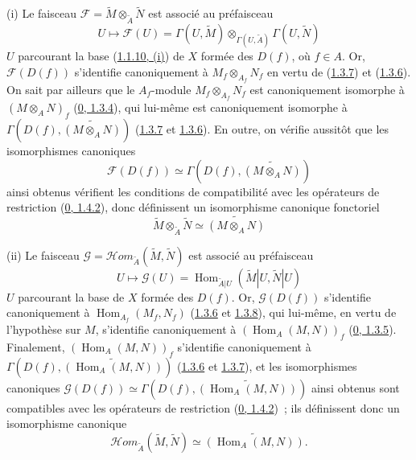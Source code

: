 (i) Le faisceau
$\mathscr{F}=\widetilde{M}\otimes_{\widetilde{A}}\widetilde{N}$ est associé
au préfaisceau
\[
  U\mapsto\mathscr{F}(U)=\Gamma(U,\widetilde{M})
  \otimes_{\Gamma(U,\widetilde{A})}\Gamma(U,\widetilde{N})
\]
$U$ parcourant la base (\hyperref[I.1.1.10-fr]{1.1.10, (i)}) de $X$ formée
des $D(f)$, où $f\in A$. Or, $\mathscr{F}(D(f))$ s'identifie canoniquement à
$M_f\otimes_{A_f}N_f$ en vertu de (\hyperref[I.1.3.7-fr]{1.3.7}) et
(\hyperref[I.1.3.6-fr]{1.3.6}). On sait par ailleurs que le $A_f$-module
$M_f\otimes_{A_f}N_f$ est canoniquement isomorphe à $(M\otimes_A N)_f$
(\hyperref[0.1.3.4-fr]{0, 1.3.4}), qui lui-même est canoniquement isomorphe à
$\Gamma(D(f),\widetilde{(M\otimes_A N)})$
(\hyperref[I.1.3.7-fr]{1.3.7} et \hyperref[I.1.3.6-fr]{1.3.6}). En outre, on
vérifie aussitôt que les isomorphismes canoniques
\[
  \mathscr{F}(D(f))\simeq\Gamma(D(f),\widetilde{(M\otimes_A N)})
\]
ainsi obtenus vérifient les conditions de compatibilité avec les opérateurs de
restriction (\hyperref[0.1.4.2-fr]{0, 1.4.2}), donc définissent un isomorphisme
canonique fonctoriel
\[
  \widetilde{M}\otimes_{\widetilde{A}}\widetilde{N}
  \simeq\widetilde{(M\otimes_A N)}
\]

(ii) Le faisceau
$\mathscr{G}=\mathscr{H}\!om_{\widetilde{A}}(\widetilde{M},\widetilde{N})$
est associé au préfaisceau
\[
  U\longmapsto\mathscr{G}(U)
  =\operatorname{Hom}_{\widetilde{A}|U}
  (\widetilde{M}|U,\widetilde{N}|U)
\]
$U$ parcourant la base de $X$ formée des $D(f)$. Or,
$\mathscr{G}(D(f))$ s'identifie canoniquement à
$\operatorname{Hom}_{A_f}(M_f,N_f)$
(\hyperref[I.1.3.6-fr]{1.3.6} et \hyperref[I.1.3.8-fr]{1.3.8}), qui
lui-même, en vertu de l'hypothèse sur $M$, s'identifie canoniquement à
$(\operatorname{Hom}_A(M,N))_f$
(\hyperref[0.1.3.5-fr]{0, 1.3.5}). Finalement,
$(\operatorname{Hom}_A(M,N))_f$ s'identifie canoniquement à
$\Gamma(D(f),\widetilde{(\operatorname{Hom}_A(M,N))})$
(\hyperref[I.1.3.6-fr]{1.3.6} et \hyperref[I.1.3.7-fr]{1.3.7}), et les
isomorphismes canoniques
$\mathscr{G}(D(f))\simeq
\Gamma(D(f),\widetilde{(\operatorname{Hom}_A(M,N))})$ ainsi obtenus sont
compatibles avec les opérateurs de restriction
(\hyperref[0.1.4.2-fr]{0, 1.4.2})~; ils définissent donc un isomorphisme
canonique
\[
  \mathscr{H}\!om_{\widetilde{A}}(\widetilde{M},\widetilde{N})
  \simeq\widetilde{(\operatorname{Hom}_A(M,N))}.
\]

